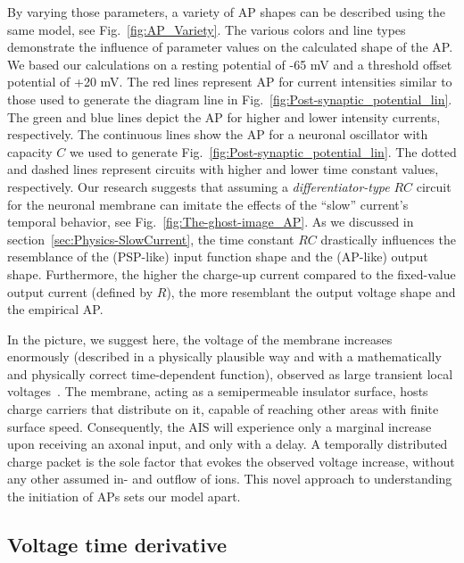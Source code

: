 By varying those parameters, a variety of %
AP shapes can be described 
using the same model, see Fig.~\ref{fig:AP_Variety}.
The various colors and line types demonstrate the influence of parameter
values on the calculated shape of the %
AP. We based our calculations
on a resting potential of -65 mV and a threshold offset potential
of +20 mV. The red lines represent 
AP for current intensities similar
to those used to generate the diagram line in Fig.~\ref{fig:Post-synaptic_potential_lin}.
The green and blue lines depict the 
AP for higher and lower
intensity currents, respectively. The continuous lines show the 
AP
for a neuronal oscillator with capacity $C$ we used to generate Fig.~\ref{fig:Post-synaptic_potential_lin}. The dotted and dashed lines represent circuits with higher and lower time constant
values, respectively.  Our research suggests that assuming a \textit{differentiator-type} $RC$
circuit for the neuronal membrane can imitate the effects of the ``slow''
current's temporal behavior, see Fig.~\ref{fig:The-ghost-image_AP}.
As we discussed in section~\ref{sec:Physics-SlowCurrent},
the time constant $RC$ drastically influences the resemblance of the
(PSP-like)
 input function shape
and the
(AP-like) output shape. Furthermore, the higher the charge-up current compared to the fixed-value output current (defined by $R$), the more
resemblant the output voltage shape and the empirical 
AP.


In the picture, we suggest here, the voltage of the membrane increases
enormously (described in a physically plausible way and with a mathematically
and physically correct time-dependent function), observed as large
transient local voltages~\cite{TransientResponses:2008,KochElectricalPropertiesSpike:1983}.
The membrane, acting as a semipermeable insulator surface, hosts charge
carriers that distribute on it, capable of reaching other areas with
finite surface speed. Consequently, the 
AIS will experience
only a marginal increase upon receiving an axonal input, and only with a delay. A temporally
distributed charge packet is the sole factor that evokes
the observed voltage increase, without any other assumed in- and outflow
of ions. This novel approach to understanding the initiation of 
APs sets our model apart.

\subsection{Voltage time derivative\label{sec:Physiology-VoltageTimeDerivative}}

